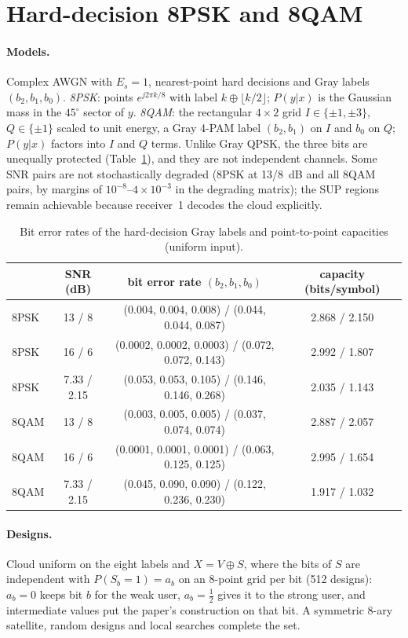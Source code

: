 \documentclass[11pt]{article}
\begin{document}
\FloatBarrier
\section{Hard-decision 8PSK and 8QAM}\label{sec:8ary}
\paragraph{Models.} Complex AWGN with $E_s=1$, nearest-point hard decisions and Gray labels $(b_2,b_1,b_0)$. \emph{8PSK}: points $e^{j2\pi k/8}$ with label $k\oplus\lfloor k/2\rfloor$; $P(y|x)$ is the Gaussian mass in the $45^\circ$ sector of $y$. \emph{8QAM}: the rectangular $4\times2$ grid $I\in\{\pm1,\pm3\}$, $Q\in\{\pm1\}$ scaled to unit energy, a Gray 4-PAM label $(b_2,b_1)$ on $I$ and $b_0$ on $Q$; $P(y|x)$ factors into $I$ and $Q$ terms. Unlike Gray QPSK, the three bits are unequally protected (Table~\ref{tab:ber}), and they are not independent channels. Some SNR pairs are not stochastically degraded (8PSK at 13/8~dB and all 8QAM pairs, by margins of $10^{-8}$--$4\times10^{-3}$ in the degrading matrix); the SUP regions remain achievable because receiver~1 decodes the cloud explicitly.

\begin{table}[t]
\centering
\caption{Bit error rates of the hard-decision Gray labels and point-to-point capacities (uniform input).}
\label{tab:ber}
\begin{tabular}{@{}lccc@{}}
\toprule
 & SNR (dB) & bit error rate $(b_2, b_1, b_0)$ & capacity (bits/symbol)\\
\midrule
8PSK & 13 / 8 & (0.004, 0.004, 0.008) / (0.044, 0.044, 0.087) & 2.868 / 2.150\\
8PSK & 16 / 6 & (0.0002, 0.0002, 0.0003) / (0.072, 0.072, 0.143) & 2.992 / 1.807\\
8PSK & 7.33 / 2.15 & (0.053, 0.053, 0.105) / (0.146, 0.146, 0.268) & 2.035 / 1.143\\
8QAM & 13 / 8 & (0.003, 0.005, 0.005) / (0.037, 0.074, 0.074) & 2.887 / 2.057\\
8QAM & 16 / 6 & (0.0001, 0.0001, 0.0001) / (0.063, 0.125, 0.125) & 2.995 / 1.654\\
8QAM & 7.33 / 2.15 & (0.045, 0.090, 0.090) / (0.122, 0.236, 0.230) & 1.917 / 1.032\\
\bottomrule
\end{tabular}
\end{table}

\paragraph{Designs.} Cloud uniform on the eight labels and $X=V\oplus S$, where the bits of $S$ are independent with $P(S_b=1)=a_b$ on an 8-point grid per bit (512 designs): $a_b=0$ keeps bit $b$ for the weak user, $a_b=\frac12$ gives it to the strong user, and intermediate values put the paper's construction on that bit. A symmetric 8-ary satellite, random designs and local searches complete the set.
\end{document}

